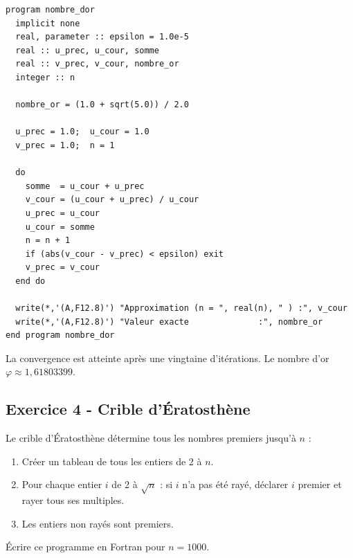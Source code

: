 \documentclass[12pt,a4paper]{article}
\begin{document}
\begin{boitecorrige}
\begin{lstlisting}
program nombre_dor
  implicit none
  real, parameter :: epsilon = 1.0e-5
  real :: u_prec, u_cour, somme
  real :: v_prec, v_cour, nombre_or
  integer :: n

  nombre_or = (1.0 + sqrt(5.0)) / 2.0

  u_prec = 1.0;  u_cour = 1.0
  v_prec = 1.0;  n = 1

  do
    somme  = u_cour + u_prec
    v_cour = (u_cour + u_prec) / u_cour
    u_prec = u_cour
    u_cour = somme
    n = n + 1
    if (abs(v_cour - v_prec) < epsilon) exit
    v_prec = v_cour
  end do

  write(*,'(A,F12.8)') "Approximation (n = ", real(n), " ) :", v_cour
  write(*,'(A,F12.8)') "Valeur exacte              :", nombre_or
end program nombre_dor
\end{lstlisting}

La convergence est atteinte après une vingtaine d'itérations. Le nombre d'or $\varphi \approx 1{,}61803399$.
\end{boitecorrige}

\subsection*{Exercice 4 - Crible d'Ératosthène \niveau{\moyen}}

\begin{boiteexercice}
Le crible d'Ératosthène détermine tous les nombres premiers jusqu'à $n$ :
\begin{enumerate}
  \item Créer un tableau de tous les entiers de 2 à $n$.
  \item Pour chaque entier $i$ de 2 à $\sqrt{n}$ : si $i$ n'a pas été rayé, déclarer $i$ premier et rayer tous ses multiples.
  \item Les entiers non rayés sont premiers.
\end{enumerate}
Écrire ce programme en Fortran pour $n=1000$.
\end{boiteexercice}
\end{document}
